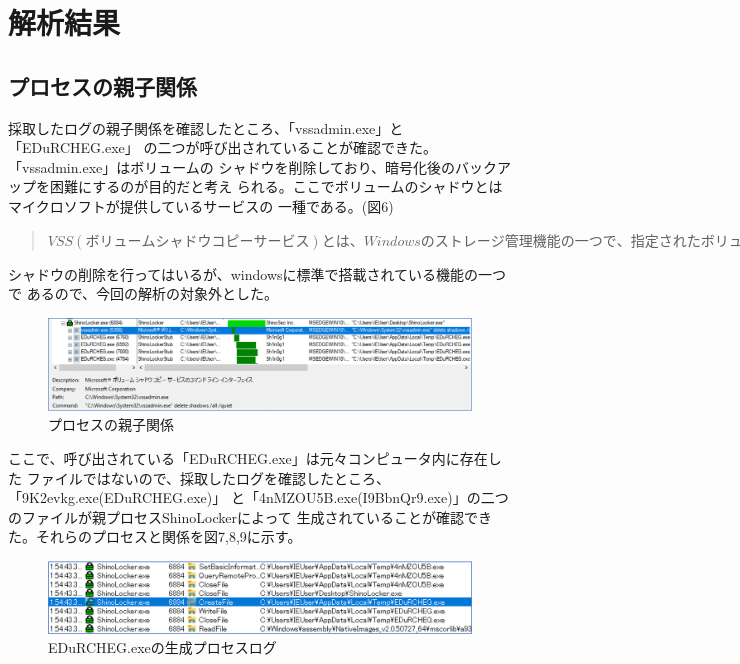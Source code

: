 \documentclass[dvipdfmx,autodetect-engine]{jsarticle}
\begin{document}
\section{解析結果}

\subsection{プロセスの親子関係}

採取したログの親子関係を確認したところ、「vssadmin.exe」と「EDuRCHEG.exe」
の二つが呼び出されていることが確認できた。「vssadmin.exe」はボリュームの
シャドウを削除しており、暗号化後のバックアップを困難にするのが目的だと考え
られる。ここでボリュームのシャドウとはマイクロソフトが提供しているサービスの
一種である。(図6)


\begin{quote}
  \begin{math}
    VSS(ボリュームシャドウコピーサービス)とは、Windowsのストレージ管理機能の一つで、指定されたボリューム
    の内容を自動的に複製し、専用の領域に保管する機能。特定の時点における
    ファイルの複製を自動的に作成し、専用の記憶領域で管理する。^{(1)}
  \end{math}
\end{quote}

シャドウの削除を行ってはいるが、windowsに標準で搭載されている機能の一つで
あるので、今回の解析の対象外とした。

\begin{figure}[H]
  \centering
  \includegraphics[scale=0.4]{pic7.png}
  \caption{プロセスの親子関係}
\end{figure}

ここで、呼び出されている「EDuRCHEG.exe」は元々コンピュータ内に存在した
ファイルではないので、採取したログを確認したところ、「9K2evkg.exe(EDuRCHEG.exe)」
と「4nMZOU5B.exe(I9BbnQr9.exe)」の二つのファイルが親プロセスShinoLockerによって
生成されていることが確認できた。それらのプロセスと関係を図7,8,9に示す。

\begin{figure}[H]
  \centering
  \includegraphics[scale=0.6]{pic8.png}
  \caption{EDuRCHEG.exeの生成プロセスログ}
\end{figure}
\end{document}
